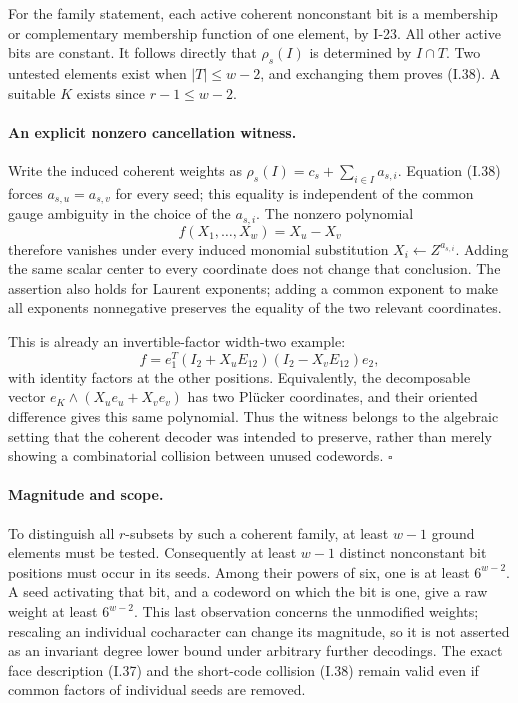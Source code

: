 For the family statement, each active coherent nonconstant
bit is a membership or complementary membership function of
one element, by I-23.  All other active bits are constant.
It follows directly that $\rho_s(I)$ is determined by
$I\cap T$.  Two untested elements exist when $|T|\le w-2$,
and exchanging them proves (I.38).  A suitable $K$ exists
since $r-1\le w-2$.

\paragraph{An explicit nonzero cancellation witness.}
Write the induced coherent weights as
$\rho_s(I)=c_s+\sum_{i\in I}a_{s,i}$.
Equation (I.38) forces $a_{s,u}=a_{s,v}$ for every seed;
this equality is independent of the common gauge ambiguity
in the choice of the $a_{s,i}$.  The nonzero polynomial
\[
 f(X_1,\ldots,X_w)=X_u-X_v
\]
therefore vanishes under every induced monomial substitution
$X_i\leftarrow Z^{a_{s,i}}$.  Adding the same scalar center
to every coordinate does not change that conclusion.
The assertion also holds for Laurent exponents; adding a
common exponent to make all exponents nonnegative preserves
the equality of the two relevant coordinates.

This is already an invertible-factor width-two example:
\[
 f=e_1^T(I_2+X_uE_{12})(I_2-X_vE_{12})e_2,
\]
with identity factors at the other positions.  Equivalently,
the decomposable vector
$e_K\wedge(X_u e_u+X_v e_v)$ has two Pl\"ucker coordinates,
and their oriented difference gives this same polynomial.
Thus the witness belongs to the algebraic setting that the
coherent decoder was intended to preserve, rather than merely
showing a combinatorial collision between unused codewords.
\hfill$\square$

\paragraph{Magnitude and scope.}
To distinguish all $r$-subsets by such a coherent family,
at least $w-1$ ground elements must be tested.  Consequently
at least $w-1$ distinct nonconstant bit positions must occur
in its seeds.  Among their powers of six, one is at least
$6^{w-2}$.  A seed activating that bit, and a codeword on
which the bit is one, give a raw weight at least $6^{w-2}$.
This last observation concerns the unmodified weights;
rescaling an individual cocharacter can change its magnitude,
so it is not asserted as an invariant degree lower bound
under arbitrary further decodings.  The exact face
description (I.37) and the short-code collision (I.38) remain
valid even if common factors of individual seeds are removed.

